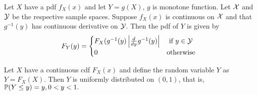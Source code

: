 \begin{theorem}
    Let $X$ have a pdf $f_X(x)$ and let $Y = g(X)$, $g$ is monotone function. Let $\mathcal X$ and $\mathcal Y$ be the respective sample spaces. Suppose $f_X(x)$ is continuous on $\mathcal X$ and that $g^{-1}(y)$ has continuous derivative on $\mathcal Y$. Then the pdf of $Y$ is given by 
    $$
    F_Y(y) = 
    \begin{cases}
    F_X(g^{-1}(y) \left\lvert \frac{d}{dy}g^{-1}(y) \right\rvert & \text{ if } y \in \mathcal Y \\
    0 & \text{otherwise}
    \end{cases}
    $$
\end{theorem}

\begin{theorem}
    Let $X$ have a continuous cdf $F_X(x)$ and define the random variable $Y$ as $Y = F_X(X)$. Then $Y$ is uniformly distributed on $(0,1)$, that is, $\mathbb P(Y \leq y) = y, 0<y<1.$
\end{theorem}